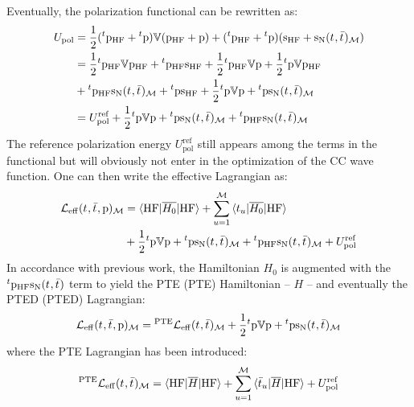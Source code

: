 Eventually, the polarization functional can be rewritten as:
\begin{equation}
  \begin{aligned}
  U_\mathrm{pol}
  &=
  \frac{1}{2}({}^t\mathrm{p}_\mathrm{HF}+{}^t\mathrm{p})\mathbb{V}(\mathrm{p}_\mathrm{HF}+\mathrm{p})
  + ({}^t\mathrm{p}_\mathrm{HF}+{}^t\mathrm{p})(\mathrm{s}_\mathrm{HF}+\mathrm{s}_{\mathrm{N}}(t_{},\bar{t}_{})_\mathcal{M}) \\
  &=
    \frac{1}{2}{}^t\mathrm{p}_\mathrm{HF}\mathbb{V}\mathrm{p}_\mathrm{HF} + {}^t\mathrm{p}_\mathrm{HF}\mathrm{s}_\mathrm{HF}
  + \frac{1}{2}{}^t\mathrm{p}_\mathrm{HF}\mathbb{V}\mathrm{p} + \frac{1}{2}{}^t\mathrm{p}\mathbb{V}\mathrm{p}_\mathrm{HF} \\
  &+ {}^t\mathrm{p}_\mathrm{HF}\mathrm{s}_{\mathrm{N}}(t_{},\bar{t}_{})_\mathcal{M}
  + {}^t\mathrm{p}\mathrm{s}_\mathrm{HF}
  + \frac{1}{2}{}^t\mathrm{p}\mathbb{V}\mathrm{p} + {}^t\mathrm{p}\mathrm{s}_{\mathrm{N}}(t_{},\bar{t}_{})_\mathcal{M} \\
  &=
    U_\mathrm{pol}^\mathrm{ref}
  + \frac{1}{2}{}^t\mathrm{p}\mathbb{V}\mathrm{p} + {}^t\mathrm{p}\mathrm{s}_{\mathrm{N}}(t_{},\bar{t}_{})_\mathcal{M}
  + {}^t\mathrm{p}_\mathrm{HF}\mathrm{s}_{\mathrm{N}}(t_{},\bar{t}_{})_\mathcal{M}
  \end{aligned}
\end{equation}
The reference polarization energy $U_\mathrm{pol}^\mathrm{ref}$ still
appears among the terms in the functional but will obviously not enter
in the optimization of the \acrshort{CC} wave function.
One can then write the effective Lagrangian as:
\begin{equation}
  \begin{aligned}
    \mathcal{L}_\mathrm{eff}(t_{}, \bar{t}_{}, \mathrm{p})_\mathcal{M} &=
  \braket{\mathrm{HF} | \overline{H_0} | \mathrm{HF}}
  + \sum_{u=1}^{\mathcal{M}}\braket{t_{u} | \overline{H_0} | \mathrm{HF}} \\
  &+
  \frac{1}{2}{}^t\mathrm{p}\mathbb{V}\mathrm{p} + {}^t\mathrm{p}\mathrm{s}_{\mathrm{N}}(t_{},\bar{t}_{})_\mathcal{M}
  + {}^t\mathrm{p}_\mathrm{HF}\mathrm{s}_{\mathrm{N}}(t_{},\bar{t}_{})_\mathcal{M}
  + U_\mathrm{pol}^\mathrm{ref}
  \end{aligned}
\end{equation}
In accordance with previous work,\autocite{Cammi2009-gu,
Caricato2011-tx} the Hamiltonian $H_0$ is augmented with the
${}^t\mathrm{p}_\mathrm{HF}\mathrm{s}_{\mathrm{N}}(t_{},\bar{t}_{})$ term to yield the
\acrlong*{PTE} (\acrshort{PTE}) Hamiltonian -- $H$ -- and eventually the
\acrlong*{PTED} (\acrshort{PTED}) Lagrangian:\autocite{Olivares_del_Valle1991-of,
Aguilar1991-vq, Olivares_del_Valle1991-tq, Olivares_del_Valle1993-xq,
Olivares_del_Valle1993-ra, Lipparini2009-io}
\begin{equation}\label{eq:pted-cc}
  \mathcal{L}_\mathrm{eff}(t_{}, \bar{t}_{}, \mathrm{p})_\mathcal{M} =
  {}^\mathrm{PTE}\mathcal{L}_\mathrm{eff}(t_{}, \bar{t}_{})_\mathcal{M}
  + \frac{1}{2}{}^t\mathrm{p}\mathbb{V}\mathrm{p} + {}^t\mathrm{p}\mathrm{s}_{\mathrm{N}}(t_{},\bar{t}_{})_\mathcal{M}
\end{equation}
where the \acrshort{PTE} Lagrangian has been introduced:
\begin{equation}
  {}^\mathrm{PTE}\mathcal{L}_\mathrm{eff}(t_{}, \bar{t}_{})_\mathcal{M}
  =
  \braket{\mathrm{HF} | \overline{H} | \mathrm{HF}}
  + \sum_{u=1}^{\mathcal{M}}\braket{\bar{t}_{u} | \overline{H} | \mathrm{HF}}
  + U_\mathrm{pol}^\mathrm{ref}
\end{equation}

